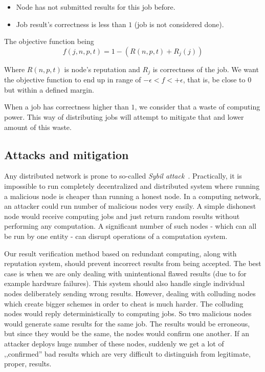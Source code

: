 \begin{itemize}
	\item Node has not submitted results for this job before.
	\item Job result's correctness is less than $1$ (job is not considered done).
\end{itemize}

The objective function being
\begin{equation}
f(j, n, p, t) = 1 - ( R(n, p, t) + R_j(j) )
\end{equation}

Where $R(n, p, t)$ is node's reputation and $R_j$ is correctness of the job. We want the objective function to end up in range of $- \epsilon < f < + \epsilon$, that is, be close to $0$ but within a defined margin.

When a job has correctness higher than $1$, we consider that a waste of computing power. This way of distributing jobs will attempt to mitigate that and lower amount of this waste.

\subsection{Attacks and mitigation}

Any distributed network is prone to so-called \emph{Sybil attack}~\cite{douceur2002sybil}. Practically, it is impossible to run completely decentralized and distributed system where running a malicious node is cheaper than running a honest node. In a computing network, an attacker could run number of malicious nodes very easily. A simple dishonest node would receive computing jobs and just return random results without performing any computation. A significant number of such nodes - which can all be run by one entity - can disrupt operations of a computation system.

Our result verification method based on redundant computing, along with reputation system, should prevent incorrect results from being accepted. The best case is when we are only dealing with unintentional flawed results (due to for example hardware failures). This system should also handle single individual nodes deliberately sending wrong results. However, dealing with colluding nodes which create bigger schemes in order to cheat is much harder. The colluding nodes would reply deterministically to computing jobs. So two malicious nodes would generate same results for the same job. The results would be erroneous, but since they would be the same, the nodes would confirm one another. If an attacker deploys huge number of these nodes, suddenly we get a lot of ,,confirmed'' bad results which are very difficult to distinguish from legitimate, proper, results.

